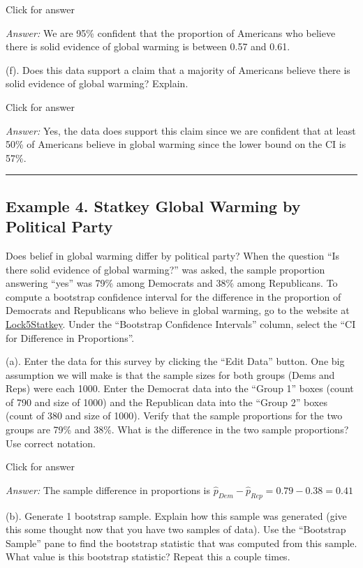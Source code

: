 \documentclass[
]{book}
\begin{document}
Click for answer

\emph{Answer:} We are 95\% confident that the proportion of Americans who believe there is solid evidence of global warming is between 0.57 and 0.61.

(f). Does this data support a claim that a majority of Americans believe there is solid evidence of global warming? Explain.

Click for answer

\emph{Answer:} Yes, the data does support this claim since we are confident that at least 50\% of Americans believe in global warming since the lower bound on the CI is 57\%.

\begin{center}\rule{0.5\linewidth}{0.5pt}\end{center}

\hypertarget{example-4.-statkey-global-warming-by-political-party}{%
\subsection{Example 4. Statkey Global Warming by Political Party}\label{example-4.-statkey-global-warming-by-political-party}}

Does belief in global warming differ by political party? When the question ``Is there solid evidence of global warming?'' was asked, the sample proportion answering ``yes'' was 79\% among Democrats and 38\% among
Republicans. To compute a bootstrap confidence interval for the difference in the proportion of Democrats
and Republicans who believe in global warming, go to the website at \href{http://www.lock5stat.com/StatKey/}{Lock5Statkey}. Under the ``Bootstrap Confidence Intervals'' column, select the ``CI for Difference in Proportions''.

(a). Enter the data for this survey by clicking the ``Edit Data'' button. One big assumption we will make is that the sample sizes for both groups (Dems and Reps) were each 1000. Enter the Democrat data into the ``Group 1'' boxes (count of 790 and size of 1000) and the Republican data into the ``Group 2'' boxes (count of 380 and size of 1000). Verify that the sample proportions for the two groups are 79\% and 38\%. What is the difference in the two sample proportions? Use correct notation.

Click for answer

\emph{Answer:} The sample difference in proportions is \(\hat{p}_{Dem} - \hat{p}_{Rep} = 0.79 - 0.38 = 0.41\)

(b). Generate 1 bootstrap sample. Explain how this sample was generated (give this some thought now that you have two samples of data). Use the ``Bootstrap Sample'' pane to find the bootstrap statistic that was computed from this sample. What value is this bootstrap statistic? Repeat this a couple times.
\end{document}
